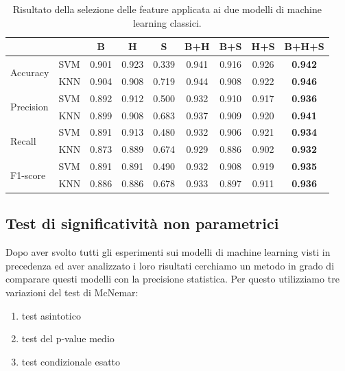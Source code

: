 \begin{table}
    \centering
    \begin{tabular}{l l c c c c c c c}
        \hline
        & & B     & H     & S     & B+H   & B+S   & H+S   & B+H+S \\
        \hline
        \multirow{2}{*}{Accuracy}   & SVM & 0.901 & 0.923 & 0.339 & 0.941 & 0.916 & 0.926 & \textbf{0.942} \\
                                    & KNN & 0.904 & 0.908 & 0.719 & 0.944 & 0.908 & 0.922 & \textbf{0.946} \\
        \hline
        \multirow{2}{*}{Precision}  & SVM & 0.892 & 0.912 & 0.500 & 0.932 & 0.910 & 0.917 & \textbf{0.936} \\      
                                    & KNN & 0.899 & 0.908 & 0.683 & 0.937 & 0.909 & 0.920 & \textbf{0.941} \\
        \hline
        \multirow{2}{*}{Recall}     & SVM & 0.891 & 0.913 & 0.480 & 0.932 & 0.906 & 0.921 & \textbf{0.934} \\
                                    & KNN & 0.873 & 0.889 & 0.674 & 0.929 & 0.886 & 0.902 & \textbf{0.932} \\
        \hline
        \multirow{2}{*}{F1-score}   & SVM & 0.891 & 0.891 & 0.490 & 0.932 & 0.908 & 0.919 & \textbf{0.935} \\
                                    & KNN & 0.886 & 0.886 & 0.678 & 0.933 & 0.897 & 0.911 & \textbf{0.936} \\
        \hline
    \end{tabular}
    \caption{Risultato della selezione delle feature applicata ai due modelli di machine learning classici.}
    \label{tab:features}
\end{table}

\subsection{Test di significatività non parametrici}
\label{ssec:tesi-di-significativita-non-parametrici}

Dopo aver svolto tutti gli esperimenti sui modelli di machine learning visti in precedenza ed aver analizzato i loro risultati cerchiamo un metodo in grado di comparare questi modelli con la precisione statistica. Per questo utilizziamo tre variazioni del test di McNemar\cite{fagerland2013mcnemar}:

\begin{enumerate}
    \item test asintotico
    \item test del p-value medio
    \item test condizionale esatto
\end{enumerate}

